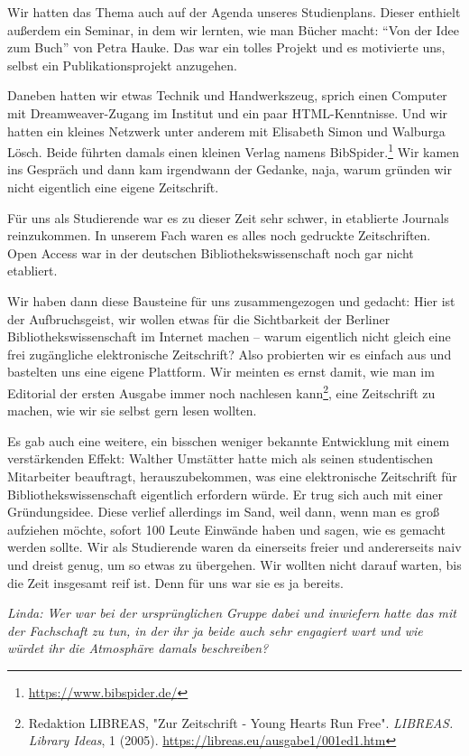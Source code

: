 \documentclass[a4paper,
fontsize=11pt,
oneside,
numbers=noperiodatend,
parskip=half-,
bibliography=totoc,
final
]{scrartcl}
\begin{document}
Wir hatten das Thema auch auf der Agenda unseres Studienplans. Dieser
enthielt außerdem ein Seminar, in dem wir lernten, wie man Bücher macht:
\enquote{Von der Idee zum Buch} von Petra Hauke. Das war ein tolles Projekt und
es motivierte uns, selbst ein Publikationsprojekt anzugehen.

Daneben hatten wir etwas Technik und Handwerkszeug, sprich einen
Computer mit Dream\-weaver-Zugang im Institut und ein paar
HTML-Kenntnisse. Und wir hatten ein kleines Netzwerk unter anderem mit
Elisabeth Simon und Walburga Lösch. Beide führten damals einen kleinen
Verlag namens BibSpider.\footnote{\url{https://www.bibspider.de/}} Wir
kamen ins Gespräch und dann kam irgendwann der Gedanke, naja, warum
gründen wir nicht eigentlich eine eigene Zeitschrift.

Für uns als Studierende war es zu dieser Zeit sehr schwer, in etablierte
Journals reinzukommen. In unserem Fach waren es alles noch gedruckte
Zeitschriften. Open Access war in der deutschen Bibliothekswissenschaft
noch gar nicht etabliert.

Wir haben dann diese Bausteine für uns zusammengezogen und gedacht: Hier
ist der Aufbruchsgeist, wir wollen etwas für die Sichtbarkeit der
Berliner Bibliothekswissenschaft im Internet machen -- warum
eigentlich nicht gleich eine frei zugängliche elektronische Zeitschrift?
Also probierten wir es einfach aus und bastelten uns eine eigene
Plattform. Wir meinten es ernst damit, wie man im Editorial der ersten
Ausgabe immer noch nachlesen kann\footnote{Redaktion LIBREAS, "Zur
  Zeitschrift - Young Hearts Run Free". \emph{LIBREAS. Library Ideas},
  1 (2005). \url{https://libreas.eu/ausgabe1/001ed1.htm}}, eine
Zeitschrift zu machen, wie wir sie selbst gern lesen wollten.

Es gab auch eine weitere, ein bisschen weniger bekannte Entwicklung mit
einem verstärkenden Effekt: Walther Umstätter hatte mich als seinen
studentischen Mitarbeiter beauftragt, herauszubekommen, was eine
elektronische Zeitschrift für Bibliothekswissenschaft eigentlich
erfordern würde. Er trug sich auch mit einer Gründungsidee. Diese
verlief allerdings im Sand, weil dann, wenn man es groß aufziehen
möchte, sofort 100 Leute Einwände haben und sagen, wie es gemacht werden
sollte. Wir als Studierende waren da einerseits freier und andererseits
naiv und dreist genug, um so etwas zu übergehen. Wir wollten nicht
darauf warten, bis die Zeit insgesamt reif ist. Denn für uns war sie es
ja bereits.

\emph{Linda: Wer war bei der ursprünglichen Gruppe dabei und inwiefern
hatte das mit der Fachschaft zu tun, in der ihr ja beide auch sehr
engagiert wart und wie würdet ihr die Atmosphäre damals beschreiben?}
\end{document}
